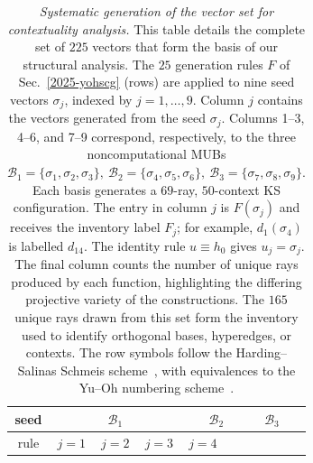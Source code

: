 \documentclass[%
  reprint,
  superscriptaddress,
  showkeys,
  amsmath,amssymb,
  aps,pra,
  longbibliography,
  floatfix,
  x11names
]{revtex4-2}
\begin{document}
\begin{table}[htbp]
\caption{\label{tab:vector_generation}
\textit{Systematic generation of the vector set for contextuality analysis.}
This table details the complete set of $225$ vectors that form the basis of our structural analysis.
The $25$ generation rules \(F\) of Sec.~\ref{2025-yohscg} (rows) are applied to nine seed vectors \(\sigma_j\), indexed by \(j=1,\ldots,9\). Column \(j\) contains the vectors generated from the seed \(\sigma_j\). Columns 1--3, 4--6, and 7--9 correspond, respectively, to the three noncomputational MUBs
\(
\mathcal B_1=\{\sigma_1,\sigma_2,\sigma_3\},\
\mathcal B_2=\{\sigma_4,\sigma_5,\sigma_6\},\
\mathcal B_3=\{\sigma_7,\sigma_8,\sigma_9\}.
\)
Each basis generates a $69$-ray, $50$-context KS configuration. The entry in column \(j\) is \(F(\sigma_j)\) and receives the inventory label \(F_j\); for example, \(d_1(\sigma_4)\) is labelled \(d_{14}\). The identity rule \(u\equiv h_0\) gives \(u_j=\sigma_j\).
The final column counts the number of unique rays produced by each function,
highlighting the differing projective variety of the constructions.
The $165$ unique rays drawn from this set form the inventory used to identify orthogonal bases, hyperedges, or contexts.
The row symbols follow the Harding--Salinas Schmeis scheme~\cite{harding2025remarksIJTP},
with equivalences to the Yu--Oh numbering scheme~\cite{Yu-2012}.
}
\begin{ruledtabular}
\begin{tabular}{ccccccccccc}
seed&
      \multicolumn{3}{c|}{$\mathcal{B}_1$}&
      \multicolumn{3}{c|}{$\mathcal{B}_2$}&
      \multicolumn{3}{c}{$\mathcal{B}_3$}\\
\hline
rule &
$j=1$ &
$j=2$ &
$j=3$ &
$j=4$ &

\end{tabular}
\end{ruledtabular}
\end{table}
\end{document}
